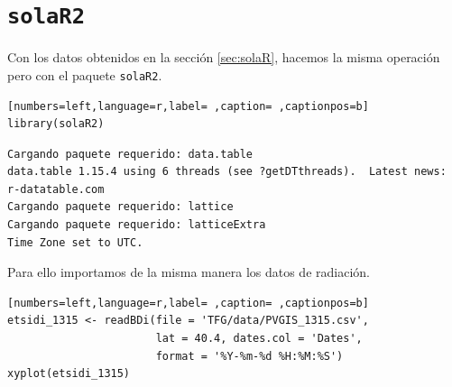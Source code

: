 \section{\texttt{solaR2}}
\label{sec:orgc0117f6}
\label{sec:solaR2}
Con los datos obtenidos en la sección \ref{sec:solaR}, hacemos la misma operación pero con el paquete \texttt{solaR2}.
\begin{lstlisting}[numbers=left,language=r,label= ,caption= ,captionpos=b]
library(solaR2)
\end{lstlisting}

\begin{verbatim}
Cargando paquete requerido: data.table
data.table 1.15.4 using 6 threads (see ?getDTthreads).  Latest news: r-datatable.com
Cargando paquete requerido: lattice
Cargando paquete requerido: latticeExtra
Time Zone set to UTC.
\end{verbatim}


Para ello importamos de la misma manera los datos de radiación.
\begin{lstlisting}[numbers=left,language=r,label= ,caption= ,captionpos=b]
etsidi_1315 <- readBDi(file = 'TFG/data/PVGIS_1315.csv',
                       lat = 40.4, dates.col = 'Dates',
                       format = '%Y-%m-%d %H:%M:%S')
xyplot(etsidi_1315)
\end{lstlisting}

